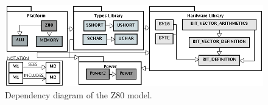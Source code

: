\documentclass[a4paper]{llncs}
\begin{document}
\begin{figure}[h]
\centering
\includegraphics[width=.87\textwidth]{diagramaEstrutural_vertical_ProB2.png}
 \caption{Dependency diagram of the Z80 model.}
\label{fig:hardware-definition-graph}
\end{figure}


%
%
%
%
\end{document}
